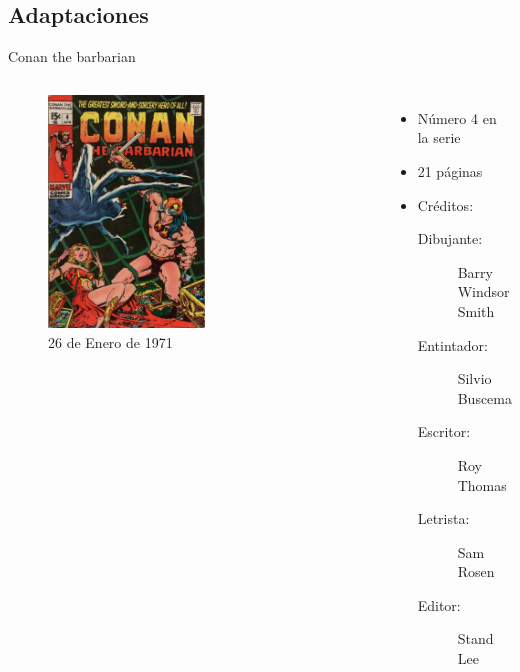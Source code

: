 \subsection{Adaptaciones}

\begin{frame}{Conan the barbarian}
\begin{columns}
    \begin{figure}[htb]
    \centering
        \includegraphics[width=0.55\textwidth]{img/TheBarbarian004Portada}
        \caption{26 de Enero de 1971}
    \end{figure}    
    \begin{itemize}
         \item Número 4 en la serie
         \item 21 páginas
         \item Créditos:
         \begin{description}
            \item[Dibujante:] Barry Windsor Smith
            \item[Entintador:] Silvio  Buscema
            \item[Escritor:] Roy Thomas
            \item[Letrista:] Sam Rosen
            \item[Editor:] Stand Lee
         \end{description}
    \end{itemize}
\end{columns}
\end{frame}

